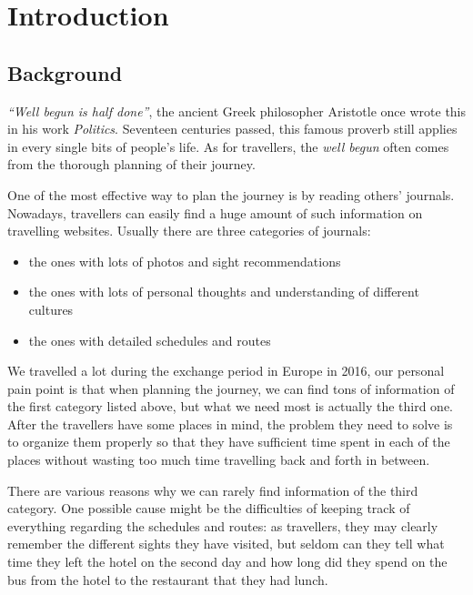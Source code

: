 \documentclass[12pt,a4paper]{article}
\begin{document}
	
	\tableofcontents


	\newpage


	\section{Introduction} %
	    \subsection{Background}
	    \label{intro:background}
        \textit{``Well begun is half done''}, the ancient Greek philosopher Aristotle once wrote this in his work \textit{Politics}. Seventeen centuries passed, this famous proverb still applies in every single bits of people's life. As for travellers, the \textit{well begun} often comes from the thorough planning of their journey.
        
        One of the most effective way to plan the journey is by reading others' journals. Nowadays, travellers can easily find a huge amount of such information on travelling websites. Usually there are three categories of journals:
        \begin{itemize}
            \setlength\itemsep{-0.5em}
            \item the ones with lots of photos and sight recommendations
            \item the ones with lots of personal thoughts and understanding of different cultures
            \item the ones with detailed schedules and routes
        \end{itemize}
        
        We travelled a lot during the exchange period in Europe in 2016, our personal pain point is that when planning the journey, we can find tons of information of the first category listed above, but what we need most is actually the third one. After the travellers have some places in mind, the problem they need to solve is to organize them properly so that they have sufficient time spent in each of the places without wasting too much time travelling back and forth in between.
        
        There are various reasons why we can rarely find information of the third category. One possible cause might be the difficulties of keeping track of everything regarding the schedules and routes: as travellers, they may clearly remember the different sights they have visited, but seldom can they tell what time they left the hotel on the second day and how long did they spend on the bus from the hotel to the restaurant that they had lunch.
        
\end{document}
